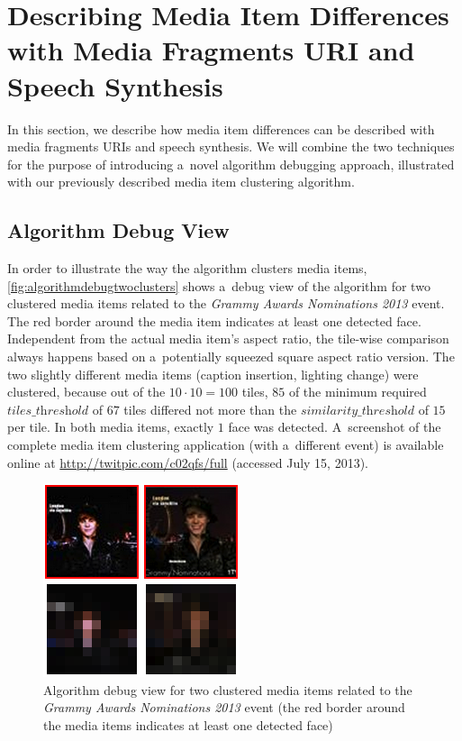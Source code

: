\section{Describing Media Item Differences with Media Fragments URI and Speech Synthesis}

In this section, we describe how media item differences
can be described with media fragments URIs and speech synthesis.
We will combine the two techniques for the purpose of
introducing a~novel algorithm debugging approach,
illustrated with our previously described
media item clustering algorithm.

\subsection{Algorithm Debug View}
\label{sec:algorithm-debug-view}

In order to illustrate the way the algorithm clusters media items,
\autoref{fig:algorithmdebugtwoclusters} shows a~debug view of the algorithm
for two clustered media items related to the 
\emph{Grammy Awards Nominations 2013} event.
The red border around the media item indicates at least one detected face.
Independent from the actual media item's aspect ratio,
the tile-wise comparison always happens based on a~potentially squeezed
square aspect ratio version.
The two slightly different media items (caption insertion, lighting change)
were clustered, because out of the $10 \cdot 10 = 100$ tiles,
$85$ of the minimum required $\textit{tiles\_threshold}$ of $67$ tiles differed not more
than the $\textit{similarity\_threshold}$ of $15$ per tile.
In both media items, exactly $1$ face was detected.
A~screenshot of the complete media item clustering application (with a~different event)
is available online at \url{http://twitpic.com/c02qfs/full} (accessed July 15, 2013).

\begin{figure}[!h]
  \centering
  \includegraphics[width=0.5\linewidth]{./algorithmdebug.png}
  \caption[Algorithm debug view for two clustered media items]
  {Algorithm debug view for two clustered media items
  related to the \emph{Grammy Awards Nominations 2013} event
  (the red border around the media items indicates at least one detected face)}
  \label{fig:algorithmdebugtwoclusters}
\end{figure}

